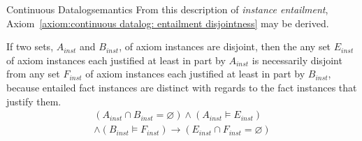 \begin{nestedsection}{Continuous Datalog}{semantics}
	From this description of \emph{instance entailment}, Axiom~\ref{axiom:continuous datalog: entailment disjointness} may be derived.

	\begin{axiom}\label{axiom:continuous datalog: entailment disjointness}
		If two sets, $A_{inst}$ and $B_{inst}$, of axiom instances are
		disjoint, then the any set $E_{inst}$ of axiom instances each
		justified at least in part by $A_{inst}$ is necessarily disjoint from
		any set $F_{inst}$ of axiom instances each justified at least in part
		by $B_{inst}$, because entailed fact instances are distinct with
		regards to the fact instances that justify them.
		\begin{multline*}
			\left( A_{inst} \cap B_{inst} = \varnothing \right) \wedge \left( A_{inst} \vDash E_{inst} \right) \\
				\wedge \left( B_{inst} \vDash F_{inst} \right) \rightarrow \left( E_{inst} \cap F_{inst} = \varnothing \right)
		\end{multline*}
	\end{axiom}


\end{nestedsection}
